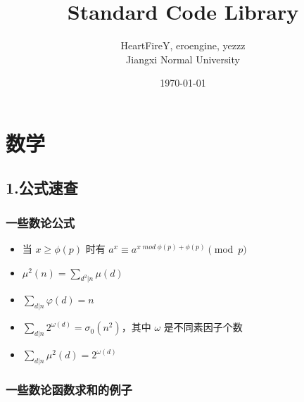 \documentclass[]{article}
\date{}
\title{\vspace{50mm} \huge Standard Code Library \\[20pt]}
\author{HeartFireY, eroengine, yezzz \\[10pt] Jiangxi Normal University}
\date{\today}
\providecommand{\tightlist}{%
  \setlength{\itemsep}{0pt}\setlength{\parskip}{0pt}}
\begin{document}
\begin{titlepage}

\maketitle

\end{titlepage}

\newpage

\renewcommand\labelitemi{$\bullet$}

{
\setcounter{tocdepth}{3}
\tableofcontents
\newpage
}








\hypertarget{ux6570ux5b66}{%
\section{数学}\label{ux6570ux5b66}}

\hypertarget{ux516cux5f0fux901fux67e5}{%
\subsection{1.公式速查}\label{ux516cux5f0fux901fux67e5}}

\hypertarget{ux4e00ux4e9bux6570ux8bbaux516cux5f0f}{%
\subsubsection{一些数论公式}\label{ux4e00ux4e9bux6570ux8bbaux516cux5f0f}}

\begin{itemize}
\tightlist
\item
  当 \(x\geq\phi(p)\) 时有
  \(a^x\equiv a^{x \; mod \; \phi(p) + \phi(p)}\pmod p\)
\item
  \(\mu^2(n)=\sum_{d^2|n} \mu(d)\)
\item
  \(\sum_{d|n} \varphi(d)=n\)
\item
  \(\sum_{d|n} 2^{\omega(d)}=\sigma_0(n^2)\)，其中 \(\omega\)
  是不同素因子个数
\item
  \(\sum_{d|n} \mu^2(d)=2^{\omega(d)}\)
\end{itemize}

\hypertarget{ux4e00ux4e9bux6570ux8bbaux51fdux6570ux6c42ux548cux7684ux4f8bux5b50}{%
\subsubsection{一些数论函数求和的例子}\label{ux4e00ux4e9bux6570ux8bbaux51fdux6570ux6c42ux548cux7684ux4f8bux5b50}}
\end{document}
